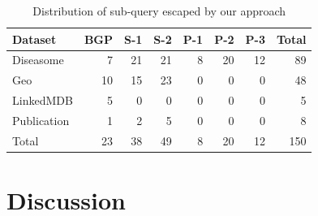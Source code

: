 \documentclass{sig-alternate}  %
\begin{document}
\begin{table}
\centering
\begin{tabular}{lrrrrrrr}
\hline
Dataset		&BGP 	&S-1&S-2&P-1&P-2&P-3&Total \\\hline
Diseasome				&7		&21	&21	&8	&20	&12	&89\\
Geo 	&10		&15	&23	&0	&0	&0	&48\\
LinkedMDB				&5		&0	&0	&0	&0	&0	&5\\
Publication			&1		&2	&5	&0	&0	&0	&8\\\hline
Total 					&23		&38	&49	&8	&20	&12	&150 \\\hline
\end{tabular}
\caption{Distribution of sub-query escaped by our approach}
\label{tab:escaped}
\end{table}
\section{Discussion}
%
%
\newpage
\end{document}
